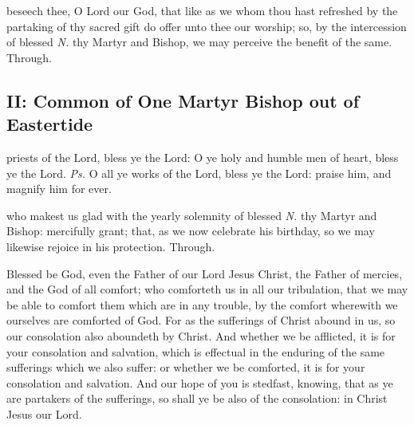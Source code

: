 
\vspace{-0.25\baselineskip}

\postcommunion

\vspace{-0.1\baselineskip}

 beseech thee, O Lord our God, that like as we whom thou hast refreshed by the partaking of thy sacred gift do offer unto thee our worship; so, by the intercession of blessed \textit{N.} thy Martyr and Bishop, we may perceive the benefit of the same. Through.


\subsection{II: Common of One Martyr Bishop out of Eastertide}\label{CommonMartyrBishopII}

\introit
{} priests of the Lord, bless ye the Lord: O ye holy and humble men of heart, bless ye the Lord. \textit{Ps.} O all ye works of the Lord, bless ye the Lord: praise him, and magnify him for ever.

\collect
{} who makest us glad with the yearly solemnity of blessed \textit{N.} thy Martyr and Bishop: mercifully grant; that, as we now celebrate his birthday, so we may likewise rejoice in his protection. Through.

\label{CommonMartyrBishopIIEpistle}
 Blessed be God, even the Father of our Lord Jesus Christ, the Father of mercies, and the God of all comfort; who comforteth us in all our tribulation, that we may be able to comfort them which are in any trouble, by the comfort wherewith we ourselves are comforted of God. For as the sufferings of Christ abound in us, so our consolation also aboundeth by Christ. And whether we be afflicted, it is for your consolation and salvation, which is effectual in the enduring of the same sufferings which we also suffer: or whether we be comforted, it is for your consolation and salvation. And our hope of you is stedfast, knowing, that as ye are partakers of the sufferings, so shall ye be also of the consolation: in Christ Jesus our Lord.

